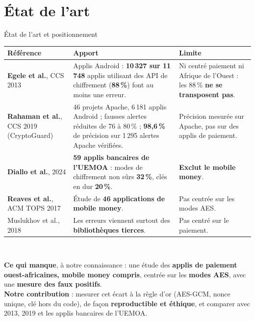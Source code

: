\documentclass[aspectratio=169,10pt]{beamer}
\begin{document}
\section{État de l'art}

\begin{frame}{État de l'art et positionnement}
  \centering\scriptsize
  \begin{tabular}{p{2.7cm}p{5.4cm}p{4.4cm}}
    \toprule
    \textbf{Référence} & \textbf{Apport} & \textbf{Limite} \\
    \midrule
    \textbf{Egele et al.}, CCS 2013 \cite{egele2013} &
      Applis Android : \textbf{10\,327 sur 11\,748} applis utilisant des API de chiffrement (\textbf{88\,\%}) font au moins une erreur. &
      Ni centré paiement ni Afrique de l'Ouest : les 88\,\% \textbf{ne se transposent pas}. \\
    \textbf{Rahaman et al.}, CCS 2019 \cite{rahaman2019} (CryptoGuard) &
      46 projets Apache, 6\,181 applis Android ; fausses alertes réduites de 76 à 80\,\% ; \textbf{98,6\,\%} de précision sur 1\,295 alertes Apache vérifiées. &
      Précision mesurée sur Apache, pas sur des applis de paiement. \\
    \textbf{Diallo et al.}, 2024 \cite{diallo2024} &
      \textbf{59 applis bancaires de l'UEMOA} : modes de chiffrement non sûrs \textbf{32\,\%},
      clés en dur \textbf{20\,\%}. &
      \textbf{Exclut le mobile money}. \\
    \textbf{Reaves et al.}, ACM TOPS 2017 \cite{reaves2017} &
      Étude de \textbf{46 applications de mobile money}. & Pas centrée sur les modes AES. \\
    Muslukhov et al., 2018 \cite{muslukhov2018} & Les erreurs viennent surtout des \textbf{bibliothèques tierces}. & Pas centré sur le paiement. \\
    \bottomrule
  \end{tabular}\\[0.3em]
  \raggedright\scriptsize
  \textbf{Ce qui manque}, à notre connaissance : une étude des \textbf{applis de paiement ouest-africaines, mobile money compris},
  centrée sur les \textbf{modes AES}, avec une \textbf{mesure des faux positifs}.\\[0.2em]
  \textbf{Notre contribution} : mesurer cet écart à la règle d'or (AES-GCM, nonce unique, clé hors du code),
  de façon \textbf{reproductible et éthique}, et comparer avec 2013, 2019 et les applis bancaires de l'UEMOA.
\end{frame}
\end{document}
